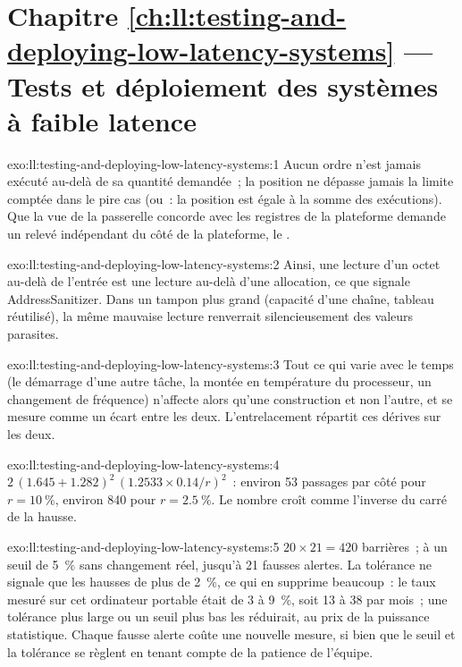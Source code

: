 \section*{Chapitre \ref{ch:ll:testing-and-deploying-low-latency-systems} --- Tests et déploiement des systèmes à faible latence}

\begin{solution}{exo:ll:testing-and-deploying-low-latency-systems:1}
Aucun ordre n'est jamais exécuté au-delà de sa quantité demandée~; la position ne dépasse jamais la limite comptée dans le pire cas (ou~: la
position est égale à la somme des exécutions). Que la vue de la passerelle concorde avec les registres de la plateforme demande un relevé indépendant
du côté de la plateforme, le .
\end{solution}

\begin{solution}{exo:ll:testing-and-deploying-low-latency-systems:2}
Ainsi, une lecture d'un octet au-delà de l'entrée est une lecture au-delà d'une allocation, ce que signale AddressSanitizer. Dans un tampon plus grand
(capacité d'une chaîne, tableau réutilisé), la même mauvaise lecture renverrait silencieusement des valeurs parasites.
\end{solution}

\begin{solution}{exo:ll:testing-and-deploying-low-latency-systems:3}
Tout ce qui varie avec le temps (le démarrage d'une autre tâche, la montée en température du processeur, un changement de fréquence) n'affecte alors qu'une construction et
non l'autre, et se mesure comme un écart entre les deux. L'entrelacement répartit ces dérives sur les deux.
\end{solution}

\begin{solution}{exo:ll:testing-and-deploying-low-latency-systems:4}
$2\,(1.645 + 1.282)^2\,(1.2533 \times 0.14 / r)^2$~: environ 53 passages par côté pour $r = 10~\%$, environ 840 pour $r = 2.5~\%$. Le
nombre croît comme l'inverse du carré de la hausse.
\end{solution}

\begin{solution}{exo:ll:testing-and-deploying-low-latency-systems:5}
$20 \times 21 = 420$ barrières~; à un seuil de 5~\% sans changement réel, jusqu'à 21 fausses alertes. La tolérance ne signale que les hausses
de plus de 2~\%, ce qui en supprime beaucoup~: le taux mesuré sur cet ordinateur portable était de 3 à 9~\%, soit 13 à 38 par mois~; une tolérance plus large ou
un seuil plus bas les réduirait, au prix de la puissance statistique. Chaque fausse alerte coûte une nouvelle mesure, si bien que le seuil et la tolérance se règlent en tenant compte de la patience de l'équipe.
\end{solution}

